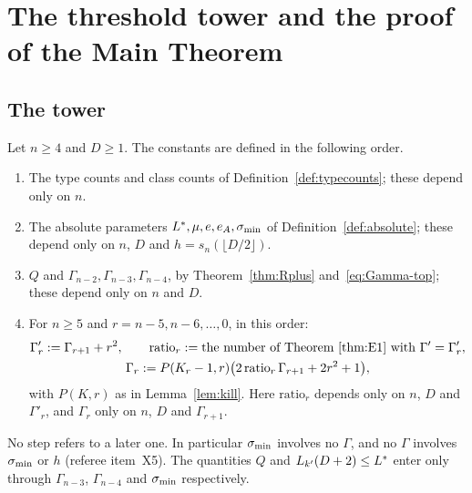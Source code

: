\section{The threshold tower and the proof of the Main Theorem}\label{sec:main}

\subsection{The tower}
Let $n\ge4$ and $D\ge1$. The constants are defined in the following order.
\begin{enumerate}[label=(\arabic*),leftmargin=2em]
\item The type counts and class counts of Definition~\ref{def:typecounts}; these depend only on $n$.
\item The absolute parameters $L^{\ast},\mu,e,e_A,\sigma_{\min}$ of Definition~\ref{def:absolute}; these depend only on $n$, $D$ and
  $h=s_n(\lfloor D/2\rfloor)$.
\item $Q$ and $\Gamma_{n-2},\Gamma_{n-3},\Gamma_{n-4}$, by Theorem~\ref{thm:Rplus} and~\eqref{eq:Gamma-top}; these depend only on $n$
  and $D$.
\item For $n\ge5$ and $r=n-5,n-6,\dots,0$, in this order:
  \begin{equation}\label{eq:Gamma-low}
  \begin{gathered}
  \Gamma'_r:=\Gamma_{r+1}+r^2,\qquad{\mathrm{ratio}}_r:=\text{the number of Theorem~\ref{thm:E1} with }\Gamma'=\Gamma'_r,\\
  \Gamma_r:=P(K_r-1,r)\bigl(2\,{\mathrm{ratio}}_r\,\Gamma_{r+1}+2r^2+1\bigr),
  \end{gathered}
  \end{equation}
  with $P(K,r)$ as in Lemma~\ref{lem:kill}. Here ${\mathrm{ratio}}_r$ depends only on $n$, $D$ and $\Gamma'_r$, and $\Gamma_r$ only on $n$,
  $D$ and $\Gamma_{r+1}$.
\end{enumerate}
No step refers to a later one. In particular $\sigma_{\min}$ involves no $\Gamma$, and no $\Gamma$ involves $\sigma_{\min}$ or $h$
(referee item~X5). The quantities $Q$ and $L_{k'}(D+2)\le L^{\ast}$ enter only through $\Gamma_{n-3}$, $\Gamma_{n-4}$ and $\sigma_{\min}$
respectively.


